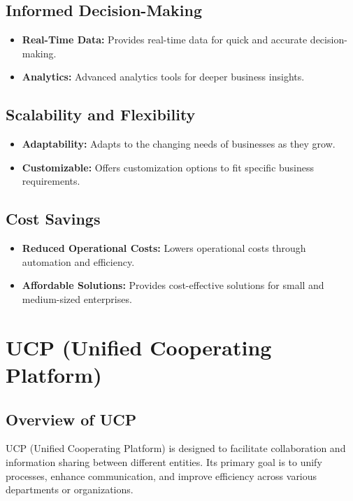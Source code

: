\documentclass[a4paper,12pt]{report}
\begin{document}
	\subsection{Informed Decision-Making}
	\begin{itemize}
		\item \textbf{Real-Time Data:} Provides real-time data for quick and accurate decision-making.
		\item \textbf{Analytics:} Advanced analytics tools for deeper business insights.
	\end{itemize}
	
	\subsection{Scalability and Flexibility}
	\begin{itemize}
		\item \textbf{Adaptability:} Adapts to the changing needs of businesses as they grow.
		\item \textbf{Customizable:} Offers customization options to fit specific business requirements.
	\end{itemize}
	
	\subsection{Cost Savings}
	\begin{itemize}
		\item \textbf{Reduced Operational Costs:} Lowers operational costs through automation and efficiency.
		\item \textbf{Affordable Solutions:} Provides cost-effective solutions for small and medium-sized enterprises.
	\end{itemize}
	
	
	\section{UCP (Unified Cooperating Platform)}
	
	\subsection{Overview of UCP}
	UCP (Unified Cooperating Platform) is designed to facilitate collaboration and information sharing between different entities. Its primary goal is to unify processes, enhance communication, and improve efficiency across various departments or organizations.
	
\end{document}
